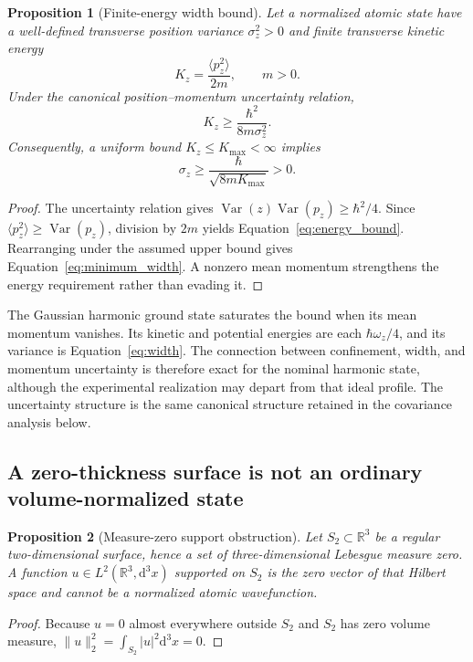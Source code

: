 \documentclass[11pt,a4paper]{article}
\newtheorem{proposition}{Proposition}[section]
\theoremstyle{definition}
\theoremstyle{remark}
\newcommand{\dd}{\mathrm{d}}
\newcommand{\Var}{\operatorname{Var}}
\newcommand{\R}{\mathbb{R}}
\begin{document}
\begin{proposition}[Finite-energy width bound]
Let a normalized atomic state have a well-defined transverse position variance $\sigma_z^2>0$ and finite transverse kinetic energy
\begin{equation}
 K_z=\frac{\langle p_z^2\rangle}{2m},\qquad m>0.
 \label{eq:kinetic}
\end{equation}
Under the canonical position--momentum uncertainty relation,
\begin{equation}
 K_z\geq\frac{\hbar^2}{8m\sigma_z^2}.
 \label{eq:energy_bound}
\end{equation}
Consequently, a uniform bound $K_z\leq K_{\max}<\infty$ implies
\begin{equation}
 \sigma_z\geq\frac{\hbar}{\sqrt{8mK_{\max}}}>0.
 \label{eq:minimum_width}
\end{equation}
\end{proposition}
\begin{proof}
The uncertainty relation gives $\Var(z)\Var(p_z)\geq\hbar^2/4$. Since $\langle p_z^2\rangle\geq\Var(p_z)$, division by $2m$ yields Equation~\eqref{eq:energy_bound}. Rearranging under the assumed upper bound gives Equation~\eqref{eq:minimum_width}. A nonzero mean momentum strengthens the energy requirement rather than evading it.
\end{proof}

The Gaussian harmonic ground state saturates the bound when its mean momentum vanishes. Its kinetic and potential energies are each $\hbar\omega_z/4$, and its variance is Equation~\eqref{eq:width}. The connection between confinement, width, and momentum uncertainty is therefore exact for the nominal harmonic state, although the experimental realization may depart from that ideal profile. The uncertainty structure is the same canonical structure retained in the covariance analysis below.\cite{hadzibabic,weedbrook}

\subsection{A zero-thickness surface is not an ordinary volume-normalized state}
\begin{proposition}[Measure-zero support obstruction]
Let $S_2\subset\R^3$ be a regular two-dimensional surface, hence a set of three-dimensional Lebesgue measure zero. A function $u\in L^2(\R^3,\dd^3x)$ supported on $S_2$ is the zero vector of that Hilbert space and cannot be a normalized atomic wavefunction.
\end{proposition}
\begin{proof}
Because $u=0$ almost everywhere outside $S_2$ and $S_2$ has zero volume measure,
$\|u\|_2^2=\int_{S_2}|u|^2\dd^3x=0$.
\end{proof}
\end{document}
